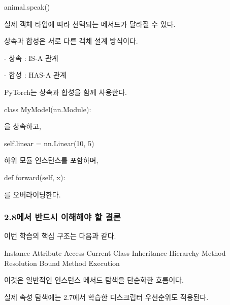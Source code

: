 \begin{dhkcode}
animal.speak()
\end{dhkcode}

실제 객체 타입에 따라 선택되는 메서드가 달라질 수 있다.

\begin{dhknote}
\begin{dhksmry}[centered]
상속과 합성은 서로 다른 객체 설계 방식이다.
\end{dhksmry}
\end{dhknote}

\begin{dhksmry}
    - 상속 : IS-A 관계

    - 합성 : HAS-A 관계
\end{dhksmry}

\begin{dhknote}
\begin{dhksmry}[centered]
PyTorch는 상속과 합성을 함께 사용한다.
\end{dhksmry}
\end{dhknote}

\begin{dhkcode}
class MyModel(nn.Module):
\end{dhkcode}

을 상속하고,

\begin{dhkcode}
self.linear = nn.Linear(10, 5)
\end{dhkcode}

하위 모듈 인스턴스를 포함하며,

\begin{dhkcode}
def forward(self, x):
\end{dhkcode}

를 오버라이딩한다.

\subsubsection{2.8에서 반드시 이해해야 할 결론}

이번 학습의 핵심 구조는 다음과 같다.

\begin{dhksmry}[centered]
Instance Attribute Access
\da
Current Class
\da
Inheritance Hierarchy
\da
Method Resolution
\da
Bound Method
\da
Execution
\end{dhksmry}

이것은 일반적인 인스턴스 메서드 탐색을 단순화한 흐름이다.

실제 속성 탐색에는 2.7에서 학습한 디스크립터 우선순위도 적용된다.

